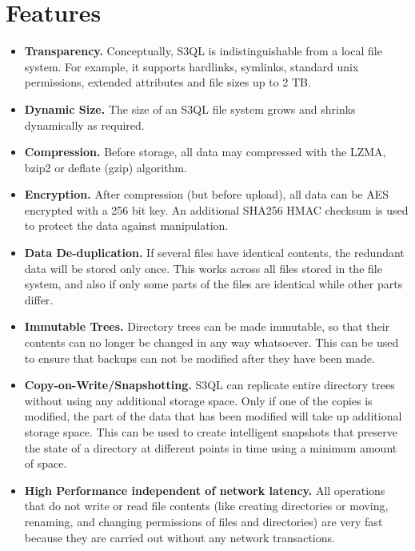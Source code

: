 \documentclass[letterpaper,10pt,english]{sphinxmanual}
\begin{document}
\section{Features}
\label{about:openstack}\label{about:features}\begin{itemize}
\item {} 
\textbf{Transparency.} Conceptually, S3QL is indistinguishable from a
local file system. For example, it supports hardlinks, symlinks,
standard unix permissions, extended attributes and file
sizes up to 2 TB.

\item {} 
\textbf{Dynamic Size.} The size of an S3QL file system grows and shrinks
dynamically as required.

\item {} 
\textbf{Compression.} Before storage, all data may compressed with the
LZMA, bzip2 or deflate (gzip) algorithm.

\item {} 
\textbf{Encryption.} After compression (but before upload), all data can be
AES encrypted with a 256 bit key. An additional SHA256 HMAC checksum
is used to protect the data against manipulation.

\item {} 
\textbf{Data De-duplication.} If several files have identical contents,
the redundant data will be stored only once. This works across all
files stored in the file system, and also if only some parts of the
files are identical while other parts differ.

\item {} 
\textbf{Immutable Trees.} Directory trees can be made immutable, so that
their contents can no longer be changed in any way whatsoever. This
can be used to ensure that backups can not be modified after they
have been made.

\item {} 
\textbf{Copy-on-Write/Snapshotting.} S3QL can replicate entire directory
trees without using any additional storage space. Only if one of the
copies is modified, the part of the data that has been modified will
take up additional storage space. This can be used to create
intelligent snapshots that preserve the state of a directory at
different points in time using a minimum amount of space.

\item {} 
\textbf{High Performance independent of network latency.} All operations
that do not write or read file contents (like creating directories
or moving, renaming, and changing permissions of files and
directories) are very fast because they are carried out without any
network transactions.


\end{itemize}
\end{document}
